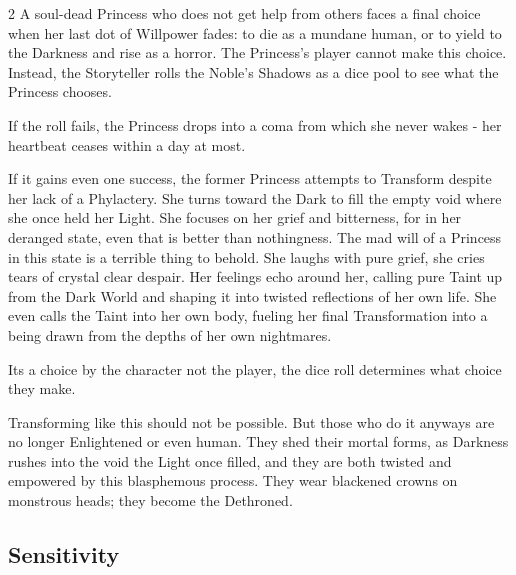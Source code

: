 \begin{multicols}{2}
A soul-dead Princess who does not get help from others faces a final choice when her last dot of Willpower fades: to die as a mundane human, or to yield to the Darkness and rise as a horror. The Princess's player cannot make this choice. Instead, the Storyteller rolls the Noble’s Shadows as a dice pool to see what the Princess chooses. 

If the roll fails, the Princess drops into a coma from which she never wakes - her heartbeat ceases within a day at most. 

If it gains even one success, the former Princess attempts to Transform despite her lack of a Phylactery. She turns toward the Dark to fill the empty void where she once held her Light. She focuses on her grief and bitterness, for in her deranged state, even that is better than nothingness. The mad will of a Princess in this state is a terrible thing to behold. She laughs with pure grief, she cries tears of crystal clear despair. Her feelings echo around her, calling pure Taint up from the Dark World and shaping it into twisted reflections of her own life. She even calls the Taint into her own body, fueling her final Transformation into a being drawn from the depths of her own nightmares.

Its a choice by the character not the player, the dice roll determines what choice they make. 


Transforming like this should not be possible. But those who do it anyways are no longer Enlightened or even human. They shed their mortal forms, as Darkness rushes into the void the Light once filled, and they are both twisted and empowered by this blasphemous process. They wear blackened crowns on monstrous heads; they become the Dethroned.

\subsection*{Sensitivity}
\label{subsec:Sensitivity}


\end{multicols}
